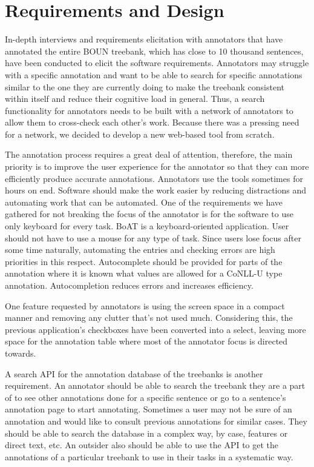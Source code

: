 \section{Requirements and Design}
\label{sec:requirements}

In-depth interviews and requirements elicitation with annotators that have annotated the entire BOUN treebank, which has close to 10 thousand sentences, have been conducted to elicit the software requirements.
Annotators may struggle with a specific annotation and want to be able to search for specific annotations similar to the one they are currently doing to make the treebank consistent within itself and reduce their cognitive load in general.
Thus, a search functionality for annotators needs to be built with a network of annotators to allow them to cross-check each other's work.
Because there was a pressing need for a network, we decided to develop a new web-based tool from scratch.

The annotation process requires a great deal of attention, therefore, the main priority is to improve the user experience for the annotator so that they can more efficiently produce accurate annotations.
Annotators use the tools sometimes for hours on end.
Software should make the work easier by reducing distractions and automating work that can be automated.
One of the requirements we have gathered for not breaking the focus of the annotator is for the software to use only keyboard for every task.
BoAT is a keyboard-oriented application.
User should not have to use a mouse for any type of task.
Since users lose focus after some time naturally, automating the entries and checking errors are high priorities in this respect.
Autocomplete should be provided for parts of the annotation where it is known what values are allowed for a CoNLL-U type annotation.
Autocompletion reduces errors and increases efficiency.

One feature requested by annotators is using the screen space in a compact manner and removing any clutter that's not used much.
Considering this, the previous application's checkboxes have been converted into a select, leaving more space for the annotation table where most of the annotator focus is directed towards.

A search API for the annotation database of the treebanks is another requirement.
An annotator should be able to search the treebank they are a part of to see other annotations done for a specific sentence or go to a sentence's annotation page to start annotating.
Sometimes a user may not be sure of an annotation and would like to consult previous annotations for similar cases.
They should be able to search the database in a complex way, by case, features or direct text, etc.
An outsider also should be able to use the API to get the annotations of a particular treebank to use in their tasks in a systematic way.